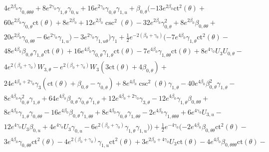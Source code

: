 \documentclass[a4paper,11pt]{article}
\numberwithin{equation}{section}
\begin{document}
\begin{align*}
&4 e^{2 \beta_{0}} \gamma_{0, \theta \theta \theta}+8 e^{2 \gamma_{0}} \gamma_{1, \theta} \gamma_{0,u}+16 e^{2 \gamma_{0}} \gamma_{0, \theta} \gamma_{1,u}+\beta_{0, \theta} (-13 e^{2 \beta_{0}} \text{ct}^2(\theta )+\\
&60 e^{2 \beta_{0}} \gamma_{0, \theta} \text{ct}(\theta )+8 e^{2 \beta_{0}}+12 e^{2 \beta_{0}} \csc ^2(\theta )-32 e^{2 \beta_{0}} \gamma_{0, \theta}^2+8 e^{2 \beta_{0}} \beta_{0, \theta \theta}+\\
&20 e^{2 \beta_{0}} \gamma_{0, \theta \theta}-6 e^{2 \gamma_{0}} \gamma_{1,u})-3 e^{2 \gamma_{0}} \gamma_{1, u \theta}) \gamma_{1}+\frac{1}{2} e^{-2 (\beta_{0}+\gamma_{0})} (-7 e^{4 \beta_{0}} \gamma_{1, \theta} \text{ct}^2(\theta )-\\
&48 e^{4 \beta_{0}} \beta_{0, \theta} \gamma_{1, \theta} \text{ct}(\theta )+16 e^{4 \beta_{0}} \gamma_{0, \theta} \gamma_{1, \theta} \text{ct}(\theta )-7 e^{4 \beta_{0}} \gamma_{1, \theta \theta} \text{ct}(\theta )+8 e^{4 \gamma_{0}} U_{3} U_{0, \theta}-\\
&4 e^{2 (\beta_{0}+\gamma_{0})} W_{3, \theta}-e^{2 (\beta_{0}+\gamma_{0})} W_{3} (3 \text{ct}(\theta )+4 \beta_{0, \theta})+\\
&24 e^{4 \beta_{0}+2 \gamma_{0}} \gamma_{3} (\text{ct}(\theta )+\beta_{0, \theta}-\gamma_{0, \theta})+8 e^{4 \beta_{0}} \csc ^2(\theta ) \gamma_{1, \theta}-40 e^{4 \beta_{0}} \beta_{0, \theta}^2 \gamma_{1, \theta}-\\
&8 e^{4 \beta_{0}} \gamma_{0, \theta}^2 \gamma_{1, \theta}+64 e^{4 \beta_{0}} \beta_{0, \theta} \gamma_{0, \theta} \gamma_{1, \theta}+12 e^{4 \beta_{0}+2 \gamma_{0}} \gamma_{3, \theta}-12 e^{4 \beta_{0}} \gamma_{1, \theta} \beta_{0, \theta \theta}+\\
&8 e^{4 \beta_{0}} \gamma_{1, \theta} \gamma_{0, \theta \theta}-16 e^{4 \beta_{0}} \beta_{0, \theta} \gamma_{1, \theta \theta}+8 e^{4 \beta_{0}} \gamma_{0, \theta} \gamma_{1, \theta \theta}-2 e^{4 \beta_{0}} \gamma_{1, \theta \theta \theta}+6 e^{4 \gamma_{0}} U_{3, u}-\\
&12 e^{4 \gamma_{0}} U_{3} \beta_{0,u}+4 e^{4 \gamma_{0}} U_{3} \gamma_{0,u}-6 e^{2 (\beta_{0}+\gamma_{0})} \gamma_{1, \theta} \gamma_{1,u}))+\frac{1}{2} e^{-4 \gamma_{0}} (-2 e^{4 \beta_{0}} \beta_{0, \theta \theta} \text{ct}^2(\theta )-\\
&3 e^{4 \beta_{0}} \gamma_{0, \theta \theta} \text{ct}^2(\theta )-4 e^{2 (\beta_{0}+\gamma_{0})} \gamma_{1,u} \text{ct}^2(\theta )+3 e^{2 \beta_{0}+4 \gamma_{0}} U_{3} \text{ct}(\theta )-4 e^{4 \beta_{0}} \beta_{0, \theta \theta \theta} \text{ct}(\theta )-\\

\end{align*}
\end{document}

